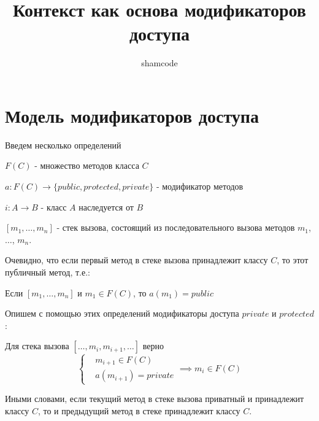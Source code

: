 \documentclass[graybox]{svmult}
\begin{document}
\title*{Контекст как основа модификаторов доступа}
\author{shamcode}
\maketitle


\section{Модель модификаторов доступа}
\label{sec:1}
Введем несколько определений
\begin{definition}
$F(C)$ - множество методов класса $C$
\end{definition}

\begin{definition}
$a: F(C) \to \{public, protected, private\}$ - модификатор методов
\end{definition}

\begin{definition}
$i: A \to B$ - класс $A$ наследуется от $B$
\end{definition}

\begin{definition}
$[m_1, \dots, m_n]$ - стек вызова, состоящий из последовательного вызова методов $m_1$, $\dots$, $m_n$. 
\end{definition}

Очевидно, что если первый метод в стеке вызова принадлежит классу $C$, то этот публичный метод, т.е.:
\begin{theorem}
\label{first_method_must_be_public}
Если $[m_1, \dots, m_n]$ и $m_1 \in F(C)$, то $a(m_1) = public$
\end{theorem}

Опишем с помощью этих определений модификаторы доступа $private$ и $protected$:

\begin{definition}
\label{private_def}
Для стека вызова $[\dots, m_i, m_{i+1}, \dots]$ верно
\begin{equation*}
\left\{
\begin{aligned}
&m_{i+1} \in F(C) \\
&a(m_{i+1}) = private
\end{aligned}
\right. 
\implies m_i \in F(C)
\end{equation*}
\end{definition}

Иными словами, если текущий метод в стеке вызова приватный и принадлежит классу $C$, то и предыдущий метод в стеке принадлежит классу $C$.
\end{document}
